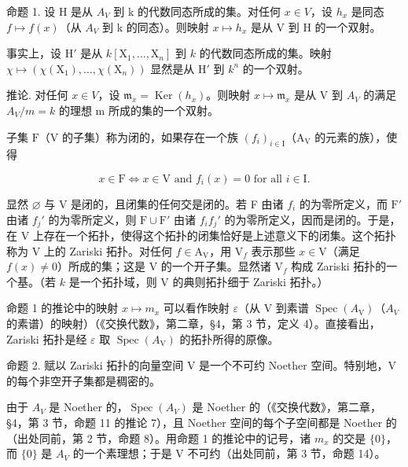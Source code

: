 命题 1. 设 H 是从 \(A_{V}\) 到 k 的代数同态所成的集。对任何 \(x \in V\)，设 \(h_{x}\) 是同态 \(f \mapsto f(x)\)（从 \(A_{V}\) 到 k 的同态）。则映射 \(x \mapsto h_{x}\) 是从 V 到 H 的一个双射。

事实上，设 \(\mathrm{H}'\) 是从 \(k[\mathrm{X}_1,\ldots ,\mathrm{X}_n]\) 到 \(k\) 的代数同态所成的集。映射 \(\chi \mapsto (\chi (\mathrm{X}_1),\dots ,\chi (\mathrm{X}_n))\) 显然是从 \(\mathrm{H}'\) 到 \(k^n\) 的一个双射。

推论. 对任何 \(x \in V\)，设 \(\mathfrak{m}_{x} = \operatorname{Ker}(h_{x})\)。则映射 \(x \mapsto \mathfrak{m}_{x}\) 是从 V 到 \(A_{V}\) 的满足 \(A_{V}/m = k\) 的理想 m 所成的集的一个双射。

子集 \(\mathrm{F}\)（\(\mathrm{V}\) 的子集）称为闭的，如果存在一个族 \((f_i)_{i\in \mathrm{I}}\)（\(\mathrm{A_V}\) 的元素的族），使得

\[
x \in \mathrm{F} \Longleftrightarrow x \in \mathrm{V} \text {   and   } f _ {i} (x) = 0 \text {   for   all   } i \in \mathrm{I}.
\]

显然 \(\varnothing\) 与 V 是闭的，且闭集的任何交是闭的。若 F 由诸 \(f_{i}\) 的为零所定义，而 \(\mathrm{F}'\) 由诸 \(f_j'\) 的为零所定义，则 \(\mathrm{F} \cup \mathrm{F}'\) 由诸 \(f_{i}f_{j}'\) 的为零所定义，因而是闭的。于是，在 V 上存在一个拓扑，使得这个拓扑的闭集恰好是上述意义下的闭集。这个拓扑称为 V 上的 Zariski 拓扑。对任何 \(f \in \mathrm{A_V}\)，用 \(\mathrm{V}_f\) 表示那些 \(x \in \mathrm{V}\)（满足 \(f(x) \neq 0\)）所成的集；这是 V 的一个开子集。显然诸 \(\mathrm{V}_f\) 构成 Zariski 拓扑的一个基。（若 \(k\) 是一个拓扑域，则 V 的典则拓扑细于 Zariski 拓扑。）

命题 1 的推论中的映射 \(x \mapsto m_{x}\) 可以看作映射 \(\varepsilon\)（从 V 到素谱 \(\operatorname{Spec}(A_{\mathrm{V}})\)（\(A_{V}\) 的素谱）的映射）（《交换代数》，第二章，§4，第 3 节，定义 4）。直接看出，Zariski 拓扑是经 \(\varepsilon\) 取 \(\operatorname{Spec}(A_{\mathrm{V}})\) 的拓扑所得的原像。

命题 2. 赋以 Zariski 拓扑的向量空间 V 是一个不可约 Noether 空间。特别地，V 的每个非空开子集都是稠密的。

由于 \(A_{V}\) 是 Noether 的，\(\operatorname{Spec}(A_{V})\) 是 Noether 的（《交换代数》，第二章，§4，第 3 节，命题 11 的推论 7），且 Noether 空间的每个子空间都是 Noether 的（出处同前，第 2 节，命题 8）。用命题 1 的推论中的记号，诸 \(m_{x}\) 的交是 \(\{0\}\)，而 \(\{0\}\) 是 \(A_{V}\) 的一个素理想；于是 V 不可约（出处同前，第 3 节，命题 14）。


